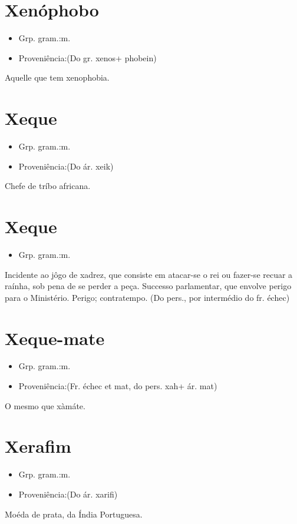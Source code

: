 \section{Xenóphobo}
\begin{itemize}
\item {Grp. gram.:m.}
\end{itemize}
\begin{itemize}
\item {Proveniência:(Do gr. \textunderscore xenos\textunderscore  + \textunderscore phobein\textunderscore )}
\end{itemize}
Aquelle que tem xenophobia.
\section{Xeque}
\begin{itemize}
\item {Grp. gram.:m.}
\end{itemize}
\begin{itemize}
\item {Proveniência:(Do ár. \textunderscore xeik\textunderscore )}
\end{itemize}
Chefe de tríbo africana.
\section{Xeque}
\begin{itemize}
\item {Grp. gram.:m.}
\end{itemize}
Incidente ao jôgo de xadrez, que consiste em atacar-se o rei ou fazer-se recuar a raínha, sob pena de se perder a peça.
Successo parlamentar, que envolve perigo para o Ministério.
Perigo; contratempo.
(Do pers., por intermédio do fr. \textunderscore échec\textunderscore )
\section{Xeque-mate}
\begin{itemize}
\item {Grp. gram.:m.}
\end{itemize}
\begin{itemize}
\item {Proveniência:(Fr. \textunderscore échec et mat\textunderscore , do pers. \textunderscore xah\textunderscore  + ár. \textunderscore mat\textunderscore )}
\end{itemize}
O mesmo que \textunderscore xàmáte\textunderscore .
\section{Xerafim}
\begin{itemize}
\item {Grp. gram.:m.}
\end{itemize}
\begin{itemize}
\item {Proveniência:(Do ár. \textunderscore xarifi\textunderscore )}
\end{itemize}
Moéda de prata, da Índia Portuguesa.
